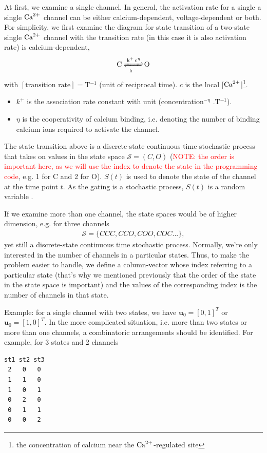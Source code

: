 At first, we examine a single channel.  In general, the activation
rate for a single a single ${\text{Ca}^{2+}}$ channel can be either
calcium-dependent, voltage-dependent or both.  For simplicity, we
first examine the diagram for state transition of a two-state single
${\text{Ca}^{2+}}$ channel with the transition rate (in this case it is also
activation rate) is calcium-dependent,
\begin{equation}
  \label{eq:177}
  \ce{C <=>[\ce{k^+ c^\eta}][k^-] O} 
\end{equation}
with $[\text{transition rate}]=$T$^{-1}$ (unit of reciprocal
time). $c$ is the local [${\text{Ca}^{2+}}$]\footnote{the concentration of
  calcium near the ${\text{Ca}^{2+}}$-regulated site}. 
\begin{itemize}
\item $k^+$ is the association rate constant with unit
  (concentration$^{-\eta}$ .T$^{-1}$). 
\item $\eta$ is the cooperativity of calcium binding, i.e. denoting
  the number of binding calcium ions required to activate the channel.
\end{itemize}

The state transition above is a discrete-state continuous time
stochastic process that takes on values in the state space
$\mathcal{S} = (C,O)$
(\textcolor{red}{NOTE: the order is important here, as we will use the
  index to denote the state in the programming code},
e.g. 1 for C and 2 for O).  $S(t)$ is used to denote the state of the
channel at the time point $t$.  As the gating is a stochastic process,
$S(t)$ is a random variable . 

If we examine more than one channel, the state spaces would be of
higher dimension, e.g. for three channels
\begin{eqnarray*}
  \mathcal{S}=\{CCC, CCO, COO, COC ... \},
\end{eqnarray*}
yet still a discrete-state continuous time stochastic
process\citep{mazzag2005erca}. Normally, we're only interested in the
number of channels in a particular states. Thus, to make the problem
easier to handle, we define a column-vector whose index referring to a
particular state (that's why we mentioned previously that the order of
the state in the state space is important) and the values of the
corresponding index is the number of channels in that state. 

Example: for a single channel with two states, we have
$\mathbf{u}_0=[0,1]^T$ or $\mathbf{u}_0=[1,0]^T$. In the more
complicated situation, i.e. more than two states or more than one
channels, a combinatoric arrangements should be identified. For
example, for 3 states and 2 channels
\begin{verbatim}
st1 st2 st3
 2   0   0
 1   1   0
 1   0   1
 0   2   0
 0   1   1
 0   0   2
\end{verbatim}

